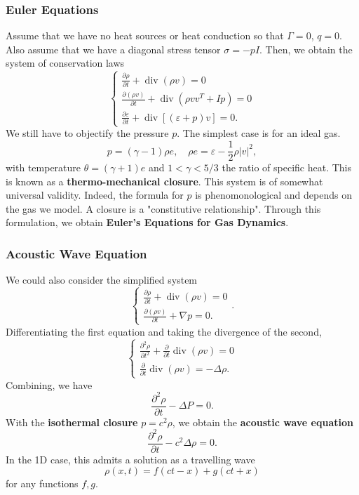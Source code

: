 \documentclass{article}
\theoremstyle{definition}
\theoremstyle{definition}
\begin{document}
\subsubsection{Euler Equations}
Assume that we have no heat sources or heat conduction so that $\Gamma=0$, $q=0$. Also assume that we have a diagonal stress tensor $\sigma=-pI$. Then, we obtain the system of conservation laws
$$\begin{cases}
    \frac{\partial \rho}{\partial t}+\operatorname{div}(\rho v)=0 \\
    \frac{\partial (\rho v)}{\partial t}+\operatorname{div}(\rho vv^T+Ip)=0 \\
    \frac{\partial \varepsilon}{\partial t}+\operatorname{div}[(\varepsilon+p)v]=0.
\end{cases}$$
We still have to objectify the pressure $p$. The simplest case is for an ideal gas.
$$p=(\gamma-1)\rho e,\quad \rho e=\varepsilon-\frac{1}{2}\rho|v|^2,$$
with temperature $\theta=(\gamma+1)e$ and $1<\gamma<5/3$ the ratio of specific heat. This is known as a \textbf{thermo-mechanical closure}. This system is of somewhat universal validity. Indeed, the formula for $p$ is phenomonological and depends on the gas we model. A closure is a "constitutive relationship". Through this formulation, we obtain \textbf{Euler's Equations for Gas Dynamics}.

\subsubsection{Acoustic Wave Equation}
We could also consider the simplified system
$$\begin{cases}
    \frac{\partial \rho}{\partial t}+\operatorname{div}(\rho v)=0 \\
    \frac{\partial (\rho v)}{\partial t}+\nabla p=0.
\end{cases}.$$
Differentiating the first equation and taking the divergence of the second,
$$\begin{cases}
    \frac{\partial^2 \rho}{\partial t^2}+\frac{\partial}{\partial t}\operatorname{div}(\rho v)=0 \\
    \frac{\partial}{\partial t}\operatorname{div}(\rho v)=-\Delta \rho.
\end{cases}$$
Combining, we have
$$\frac{\partial^2\rho}{\partial t}-\Delta P=0.$$
With the \textbf{isothermal closure} $p=c^2\rho$, we obtain the \textbf{acoustic wave equation}
$$\frac{\partial^2\rho}{\partial t}-c^2\Delta \rho=0.$$
In the 1D case, this admits a solution as a travelling wave
$$\rho(x,t)=f(ct-x)+g(ct+x)$$
for any functions $f,g$.
\end{document}
